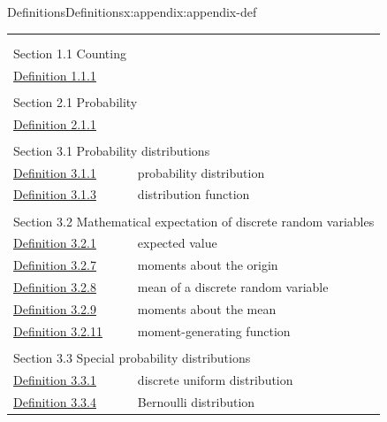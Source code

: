 \documentclass[oneside,10pt,]{book}
\numberwithin{equation}{section}
\begin{document}
\begin{appendixptx}{Definitions}{}{Definitions}{}{}{x:appendix:appendix-def}
\noindent
\begin{longtable}[l]{ll}
\addtocounter{table}{-1}
\endfirsthead
\endhead
\multicolumn{2}{r}{(Continued on next page)}\\
\endfoot
\endlastfoot
\multicolumn{2}{l}{\null}\\[1.5ex] \multicolumn{2}{l}{\large Section 1.1 Counting}\\[0.5ex]
\hyperref[x:definition:counting]{Definition 1.1.1}& \\
\multicolumn{2}{l}{\null}\\[1.5ex] \multicolumn{2}{l}{\large Section 2.1 Probability}\\[0.5ex]
\hyperref[x:definition:probability]{Definition 2.1.1}& \\
\multicolumn{2}{l}{\null}\\[1.5ex] \multicolumn{2}{l}{\large Section 3.1 Probability distributions}\\[0.5ex]
\hyperref[x:definition:def-probability-distribution-3-2]{Definition 3.1.1}& probability distribution\\
\hyperref[x:definition:def-distribution-function-3-3]{Definition 3.1.3}& distribution function\\
\multicolumn{2}{l}{\null}\\[1.5ex] \multicolumn{2}{l}{\large Section 3.2 Mathematical expectation of discrete random variables}\\[0.5ex]
\hyperref[x:definition:def-expected-value-4-1]{Definition 3.2.1}& expected value\\
\hyperref[x:definition:def-moments-about-origin-4-2]{Definition 3.2.7}& moments about the origin\\
\hyperref[x:definition:def-mean-4-3]{Definition 3.2.8}& mean of a discrete random variable\\
\hyperref[x:definition:def-moments-about-mean-4-4]{Definition 3.2.9}& moments about the mean\\
\hyperref[x:definition:def-mgf-4-6]{Definition 3.2.11}& moment-generating function\\
\multicolumn{2}{l}{\null}\\[1.5ex] \multicolumn{2}{l}{\large Section 3.3 Special probability distributions}\\[0.5ex]
\hyperref[x:definition:def-discrete-unif]{Definition 3.3.1}& discrete uniform distribution\\
\hyperref[x:definition:def-bern]{Definition 3.3.4}& Bernoulli distribution\\

\end{longtable}
\end{appendixptx}
\end{document}
